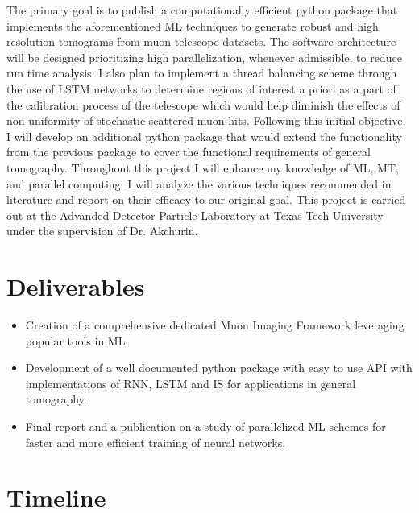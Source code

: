 \documentclass[10pt]{article}
\begin{document}

\vspace{2mm}
The primary goal is to publish a computationally efficient python package that implements the aforementioned ML techniques to generate robust and high resolution tomograms from muon telescope datasets. The software architecture will be designed prioritizing high parallelization, whenever admissible, to reduce run time analysis. I also plan to implement a thread balancing scheme through the use of LSTM networks to determine regions of interest a priori as a part of the calibration process of the telescope which would help diminish the effects of non-uniformity of stochastic scattered muon hits. Following this initial objective, I will develop an additional python package that would extend the functionality from the previous package to cover the functional requirements of general tomography. Throughout this project I will enhance my knowledge of ML, MT, and parallel computing. I will analyze the various techniques recommended in literature and report on their efficacy to our original goal. This project is carried out at the Advanded Detector Particle Laboratory at Texas Tech University under the supervision of Dr. Akchurin.

\section{Deliverables}

\begin{itemize}
    \item Creation of a comprehensive dedicated Muon Imaging Framework leveraging popular tools in ML.
    \item Development of a well documented python package with easy to use API with implementations of RNN, LSTM and IS for applications in general tomography.
    \item Final report and a publication on a study of parallelized ML schemes for faster and more efficient training of neural networks.
\end{itemize}

\section{Timeline}
\end{document}
